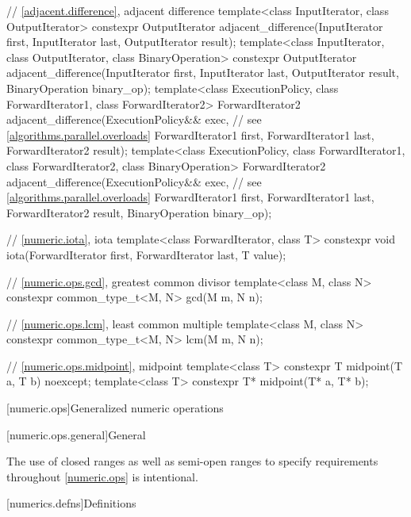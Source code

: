 \begin{codeblock}
{  // \ref{adjacent.difference}, adjacent difference
  template<class InputIterator, class OutputIterator>
    constexpr OutputIterator
      adjacent_difference(InputIterator first, InputIterator last,
                          OutputIterator result);
  template<class InputIterator, class OutputIterator, class BinaryOperation>
    constexpr OutputIterator
      adjacent_difference(InputIterator first, InputIterator last,
                          OutputIterator result, BinaryOperation binary_op);
  template<class ExecutionPolicy, class ForwardIterator1, class ForwardIterator2>
    ForwardIterator2
      adjacent_difference(ExecutionPolicy&& exec,               // see \ref{algorithms.parallel.overloads}
                          ForwardIterator1 first, ForwardIterator1 last,
                          ForwardIterator2 result);
  template<class ExecutionPolicy, class ForwardIterator1, class ForwardIterator2,
           class BinaryOperation>
    ForwardIterator2
      adjacent_difference(ExecutionPolicy&& exec,               // see \ref{algorithms.parallel.overloads}
                          ForwardIterator1 first, ForwardIterator1 last,
                          ForwardIterator2 result, BinaryOperation binary_op);

  // \ref{numeric.iota}, iota
  template<class ForwardIterator, class T>
    constexpr void iota(ForwardIterator first, ForwardIterator last, T value);

  // \ref{numeric.ops.gcd}, greatest common divisor
  template<class M, class N>
    constexpr common_type_t<M, N> gcd(M m, N n);

  // \ref{numeric.ops.lcm}, least common multiple
  template<class M, class N>
    constexpr common_type_t<M, N> lcm(M m, N n);

  // \ref{numeric.ops.midpoint}, midpoint
  template<class T>
    constexpr T midpoint(T a, T b) noexcept;
  template<class T>
    constexpr T* midpoint(T* a, T* b);
}
\end{codeblock}

[numeric.ops]{Generalized numeric operations}

[numeric.ops.general]{General}

\pnum
\begin{note}
The use of closed ranges as well as semi-open ranges
to specify requirements throughout \ref{numeric.ops} is intentional.
\end{note}

[numerics.defns]{Definitions}

